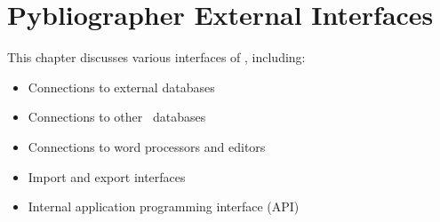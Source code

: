 
\chapter{Pybliographer External Interfaces }
\label{cha:extrn}

This chapter discusses various interfaces of \Pyb, including:
\begin{itemize}
\item Connections to external databases
\item Connections to other \Pyb\ databases
\item Connections to word processors and editors
\item Import and export interfaces
\item Internal application programming interface (API)
\end{itemize}

